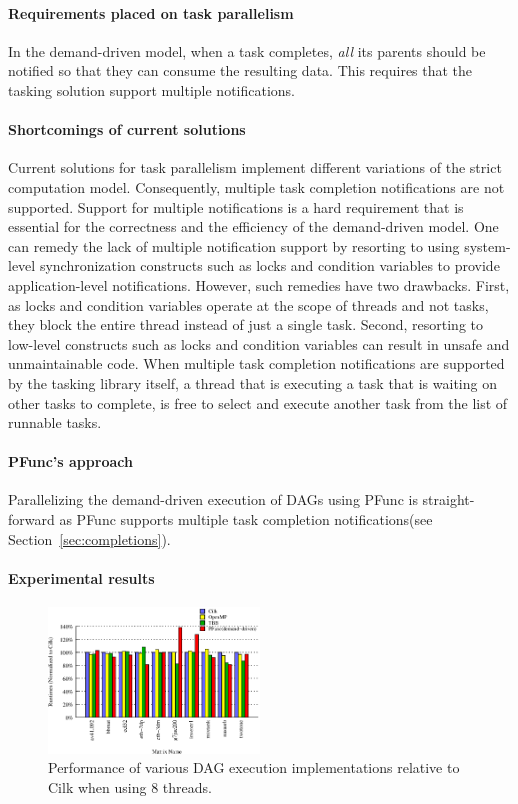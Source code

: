 \documentclass{sig-alternate}
\begin{document}
\paragraph{Requirements placed on task parallelism}
In the demand-driven model, when a task completes, \textit{all} its parents
should be notified so that they can consume the resulting data.  This requires
that the tasking solution support multiple notifications. 

\paragraph{Shortcomings of current solutions}
Current solutions for task parallelism implement different variations of the
strict computation model. Consequently, multiple task completion
notifications are not supported.  Support for multiple notifications is a hard
requirement that is essential for the correctness and the efficiency of the
demand-driven model.  One can remedy the lack of multiple notification support
by resorting to using system-level synchronization constructs such as locks and
condition variables to provide application-level notifications.  However, such
remedies have two drawbacks. First, as locks and condition variables operate at
the scope of threads and not tasks, they block the entire thread instead of
just a single task. Second, resorting to low-level constructs such as locks and
condition variables can result in unsafe and unmaintainable code.  When
multiple task completion notifications are supported by the tasking library
itself, a thread that is executing a task that is waiting on other tasks to
complete, is free to select and execute another task from the list of runnable
tasks.

\paragraph{PFunc's approach}
Parallelizing the demand-driven execution of DAGs using PFunc is
straight-forward as PFunc supports multiple task completion notifications(see
Section~\ref{sec:completions}). 

\paragraph{Experimental results}
\begin{figure}[t]
\includegraphics[width=0.5\textwidth]{dagresults/dag_speedup}
\caption{Performance of various DAG execution implementations relative to Cilk
when using 8 threads.}
\label{fig:dag_speedup}
\end{figure}
\end{document}
